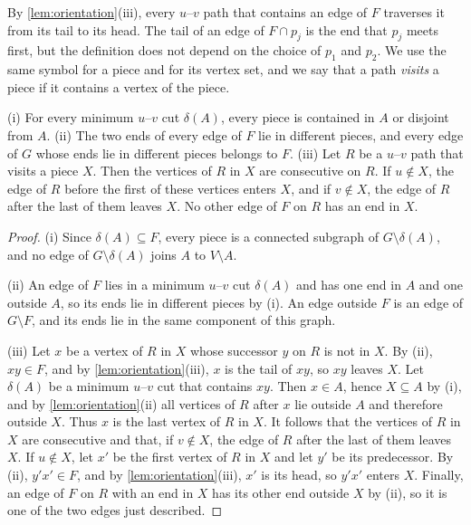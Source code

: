 \documentclass[pdflatex,sn-mathphys-num]{sn-jnl}%
\theoremstyle{thmstyleone}%
\theoremstyle{thmstyletwo}%
\theoremstyle{thmstylethree}%
\begin{document}
By \cref{lem:orientation}(iii), every $u$--$v$ path that contains an edge of $F$ traverses it from its tail to its head.
The tail of an edge of $F \cap p_j$ is the end that $p_j$ meets first, but the definition does not depend on the choice of $p_1$ and $p_2$.
We use the same symbol for a piece and for its vertex set, and we say that a path \emph{visits} a piece if it contains a vertex of the piece.

\begin{lemma}
\label{lem:pieces}
(i) For every minimum $u$--$v$ cut $\delta(A)$, every piece is contained in $A$ or disjoint from $A$.
(ii) The two ends of every edge of $F$ lie in different pieces, and every edge of $G$ whose ends lie in different pieces belongs to $F$.
(iii) Let $R$ be a $u$--$v$ path that visits a piece $X$.
Then the vertices of $R$ in $X$ are consecutive on $R$.
If $u \notin X$, the edge of $R$ before the first of these vertices enters $X$, and if $v \notin X$, the edge of $R$ after the last of them leaves $X$.
No other edge of $F$ on $R$ has an end in $X$.
\end{lemma}

\begin{proof}
(i) Since $\delta(A) \subseteq F$, every piece is a connected subgraph of $G \setminus \delta(A)$, and no edge of $G \setminus \delta(A)$ joins $A$ to $V \setminus A$.

(ii) An edge of $F$ lies in a minimum $u$--$v$ cut $\delta(A)$ and has one end in $A$ and one outside $A$, so its ends lie in different pieces by (i).
An edge outside $F$ is an edge of $G \setminus F$, and its ends lie in the same component of this graph.

(iii) Let $x$ be a vertex of $R$ in $X$ whose successor $y$ on $R$ is not in $X$.
By (ii), $xy \in F$, and by \cref{lem:orientation}(iii), $x$ is the tail of $xy$, so $xy$ leaves $X$.
Let $\delta(A)$ be a minimum $u$--$v$ cut that contains $xy$.
Then $x \in A$, hence $X \subseteq A$ by (i), and by \cref{lem:orientation}(ii) all vertices of $R$ after $x$ lie outside $A$ and therefore outside $X$.
Thus $x$ is the last vertex of $R$ in $X$.
It follows that the vertices of $R$ in $X$ are consecutive and that, if $v \notin X$, the edge of $R$ after the last of them leaves $X$.
If $u \notin X$, let $x'$ be the first vertex of $R$ in $X$ and let $y'$ be its predecessor.
By (ii), $y'x' \in F$, and by \cref{lem:orientation}(iii), $x'$ is its head, so $y'x'$ enters $X$.
Finally, an edge of $F$ on $R$ with an end in $X$ has its other end outside $X$ by (ii), so it is one of the two edges just described.
\end{proof}
\end{document}
